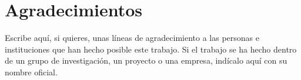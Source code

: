 \chapter*{Agradecimientos}

Escribe aquí, si quieres, unas líneas de agradecimiento a las personas e
instituciones que han hecho posible este trabajo. Si el trabajo se ha hecho
dentro de un grupo de investigación, un proyecto o una empresa, indícalo aquí
con su nombre oficial.

\cleardoublepage
